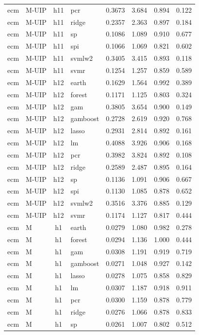 \begin{ThreePartTable}
\begin{longtable}[t]{llclcccc}
ecm & M-UIP & h11 & pcr & 0.3673 & 3.684 & 0.894 & 0.122\\
ecm & M-UIP & h11 & ridge & 0.2357 & 2.363 & 0.897 & 0.184\\
ecm & M-UIP & h11 & sp & 0.1086 & 1.089 & 0.910 & 0.677\\
ecm & M-UIP & h11 & spi & 0.1066 & 1.069 & 0.821 & 0.602\\
ecm & M-UIP & h11 & svmlw2 & 0.3405 & 3.415 & 0.893 & 0.118\\
ecm & M-UIP & h11 & svmr & 0.1254 & 1.257 & 0.859 & 0.589\\
\addlinespace
ecm & M-UIP & h12 & earth & 0.1629 & 1.564 & 0.992 & 0.389\\
ecm & M-UIP & h12 & forest & 0.1171 & 1.125 & 0.803 & 0.324\\
ecm & M-UIP & h12 & gam & 0.3805 & 3.654 & 0.900 & 0.149\\
ecm & M-UIP & h12 & gamboost & 0.2728 & 2.619 & 0.920 & 0.768\\
ecm & M-UIP & h12 & lasso & 0.2931 & 2.814 & 0.892 & 0.161\\
ecm & M-UIP & h12 & lm & 0.4088 & 3.926 & 0.906 & 0.168\\
ecm & M-UIP & h12 & pcr & 0.3982 & 3.824 & 0.892 & 0.108\\
ecm & M-UIP & h12 & ridge & 0.2589 & 2.487 & 0.895 & 0.164\\
ecm & M-UIP & h12 & sp & 0.1136 & 1.091 & 0.906 & 0.667\\
ecm & M-UIP & h12 & spi & 0.1130 & 1.085 & 0.878 & 0.652\\
ecm & M-UIP & h12 & svmlw2 & 0.3516 & 3.376 & 0.885 & 0.129\\
ecm & M-UIP & h12 & svmr & 0.1174 & 1.127 & 0.817 & 0.444\\
\addlinespace
ecm & M & h1 & earth & 0.0279 & 1.080 & 0.982 & 0.278\\
ecm & M & h1 & forest & 0.0294 & 1.136 & 1.000 & 0.444\\
ecm & M & h1 & gam & 0.0308 & 1.191 & 0.919 & 0.719\\
ecm & M & h1 & gamboost & 0.0271 & 1.048 & 0.927 & 0.142\\
ecm & M & h1 & lasso & 0.0278 & 1.075 & 0.858 & 0.829\\
ecm & M & h1 & lm & 0.0307 & 1.187 & 0.918 & 0.911\\
ecm & M & h1 & pcr & 0.0300 & 1.159 & 0.878 & 0.779\\
ecm & M & h1 & ridge & 0.0276 & 1.066 & 0.878 & 0.833\\
ecm & M & h1 & sp & 0.0261 & 1.007 & 0.802 & 0.512\\

\end{longtable}
\end{ThreePartTable}
